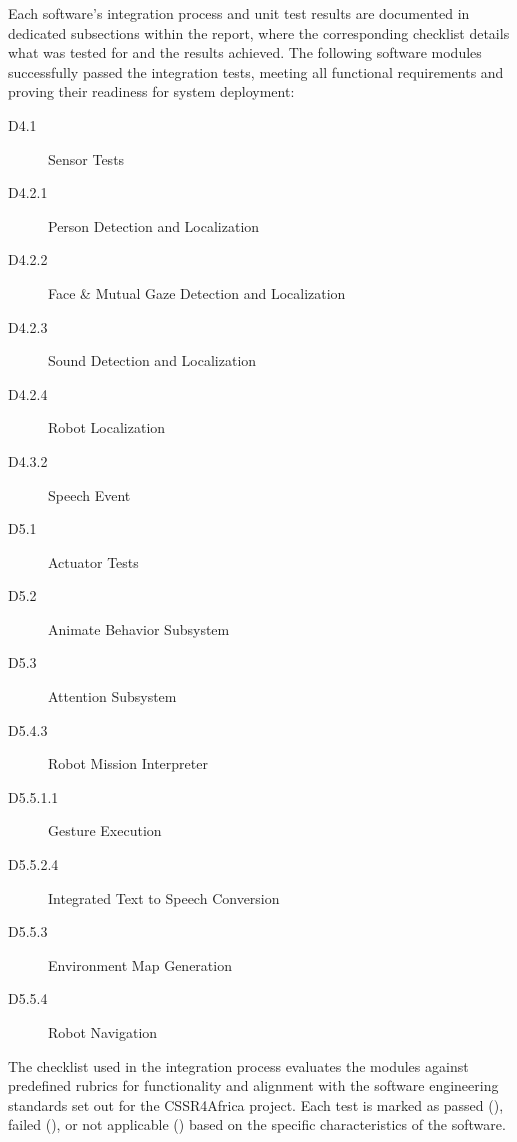 \documentclass{CSSRforAfrica}
\newcommand{\checkboxChecked}{\fbox{\ding{51}}} %
\newcommand{\checkboxCrossed}{\fbox{\ding{55}}} %
\newcommand{\checkboxDashed}{\fbox{--}}         %
\begin{document}
\noindent Each software's integration process and unit test results are documented in dedicated subsections within the report, where the corresponding checklist details what was tested for and the results achieved.
The following software modules successfully passed the integration tests, meeting all functional requirements and proving their readiness for system deployment:
\begin{description}
    \item[D4.1] Sensor Tests
    \item[D4.2.1] Person Detection and Localization
    \item[D4.2.2] Face \& Mutual Gaze Detection and Localization
    \item[D4.2.3] Sound Detection and Localization
    \item[D4.2.4] Robot Localization
    \item[D4.3.2] Speech Event
    \item[D5.1] Actuator Tests
    \item[D5.2] Animate Behavior Subsystem
    \item[D5.3] Attention Subsystem
    \item[D5.4.3] Robot Mission Interpreter
    \item[D5.5.1.1] Gesture Execution
    \item[D5.5.2.4] Integrated Text to Speech Conversion
    \item[D5.5.3] Environment Map Generation
    \item[D5.5.4] Robot Navigation
\end{description}



\noindent The checklist used in the integration process evaluates the modules against predefined rubrics for functionality and alignment with the software engineering standards set out for the CSSR4Africa project. Each test is marked as passed (\checkboxChecked), failed (\checkboxCrossed), or not applicable (\checkboxDashed) based on the specific characteristics of the software. 
\end{document}
